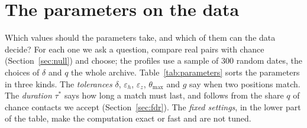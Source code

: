 \section{The parameters on the data}\label{sec:tuning}

Which values should the parameters take, and which of them can the data decide? For each one we
ask a question, compare real pairs with chance (Section~\ref{sec:null}) and choose; the profiles
use a sample of 300 random dates, the choices of $\delta$ and $q$ the whole archive.
Table~\ref{tab:parameters} sorts the parameters in three kinds. The \emph{tolerances} $\delta$,
$\varepsilon_h$, $\varepsilon_z$, $\theta_{\max}$ and $g$ say when two positions match. The
\emph{duration} $\tau^*$ says how long a match must last, and follows from the share $q$ of chance
contacts we accept (Section~\ref{sec:fdr}). The \emph{fixed settings}, in the lower part of the
table, make the computation exact or fast and are not tuned.\label{sec:fixed}

